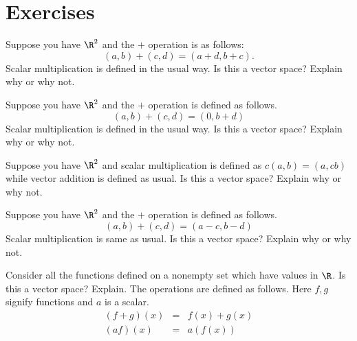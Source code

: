 \section*{Exercises}


\begin{ex} Suppose you have $\R^{2}$ and the $+$ operation is as
follows:\
\begin{equation*}
(a,b) +(c,d) =(a+d,b+c) .
\end{equation*}
Scalar multiplication is defined in the usual way. Is this a vector space?
Explain why or why not.
\end{ex}

\begin{ex} Suppose you have $\R^{2}$ and the $+$ operation is defined as
follows.
\begin{equation*}
(a,b) +(c,d) =(0,b+d)
\end{equation*}
Scalar multiplication is defined in the usual way. Is this a vector space?
Explain why or why not.
\end{ex}

\begin{ex} Suppose you have $\R^{2}$ and scalar multiplication is defined
as $c(a,b) =(a,cb) $ while vector addition is
defined as usual. Is this a vector space? Explain why or why not.
\end{ex}

\begin{ex} Suppose you have $\R^{2}$ and the $+$ operation is defined as
follows.
\begin{equation*}
(a,b) +(c,d) =(a-c,b-d)
\end{equation*}
Scalar multiplication is same as usual. Is this a vector space? Explain why
or why not.
\end{ex}

\begin{ex} \label{functions}Consider all the functions defined on a nonempty set
which have values in $\R$. Is this a vector space? Explain.
The operations are defined as follows. Here $f,g$ signify functions and $a$
is a scalar.
\begin{eqnarray*}
(f+g) (x) &=&f(x) +g(x) \\
(af) (x) &=&a(f(x))
\end{eqnarray*}
\end{ex}


